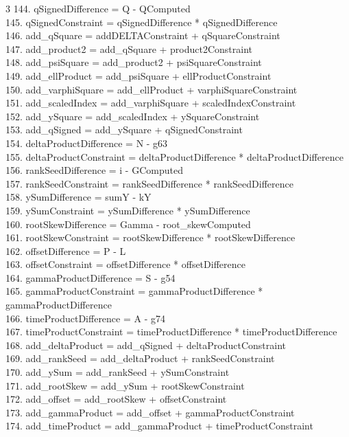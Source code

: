 \documentclass[10pt]{article}
\begin{document}
\begin{multicols}{3}
144. qSignedDifference = Q - QComputed\\
145. qSignedConstraint = qSignedDifference * qSignedDifference\\
146. add\_qSquare = addDELTAConstraint + qSquareConstraint\\
147. add\_product2 = add\_qSquare + product2Constraint\\
148. add\_psiSquare = add\_product2 + psiSquareConstraint\\
149. add\_ellProduct = add\_psiSquare + ellProductConstraint\\
150. add\_varphiSquare = add\_ellProduct + varphiSquareConstraint\\
151. add\_scaledIndex = add\_varphiSquare + scaledIndexConstraint\\
152. add\_ySquare = add\_scaledIndex + ySquareConstraint\\
153. add\_qSigned = add\_ySquare + qSignedConstraint\\
154. deltaProductDifference = N - g63\\
155. deltaProductConstraint = deltaProductDifference * deltaProductDifference\\
156. rankSeedDifference = i - GComputed\\
157. rankSeedConstraint = rankSeedDifference * rankSeedDifference\\
158. ySumDifference = sumY - kY\\
159. ySumConstraint = ySumDifference * ySumDifference\\
160. rootSkewDifference = Gamma - root\_skewComputed\\
161. rootSkewConstraint = rootSkewDifference * rootSkewDifference\\
162. offsetDifference = P - L\\
163. offsetConstraint = offsetDifference * offsetDifference\\
164. gammaProductDifference = S - g54\\
165. gammaProductConstraint = gammaProductDifference * gammaProductDifference\\
166. timeProductDifference = A - g74\\
167. timeProductConstraint = timeProductDifference * timeProductDifference\\
168. add\_deltaProduct = add\_qSigned + deltaProductConstraint\\
169. add\_rankSeed = add\_deltaProduct + rankSeedConstraint\\
170. add\_ySum = add\_rankSeed + ySumConstraint\\
171. add\_rootSkew = add\_ySum + rootSkewConstraint\\
172. add\_offset = add\_rootSkew + offsetConstraint\\
173. add\_gammaProduct = add\_offset + gammaProductConstraint\\
174. add\_timeProduct = add\_gammaProduct + timeProductConstraint\\
\end{multicols}
\end{document}
